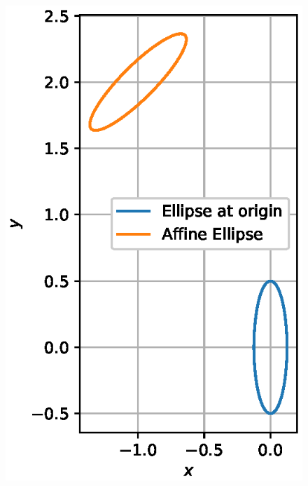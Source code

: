 \begin{enumerate}[label=\arabic*.,ref=\thesubsection.\theenumi]
\begin{figure}[!ht]
\includegraphics[width=\columnwidth]{./conics/figs/ellipse.eps}
\caption{}
\label{fig:ellipse}
\end{figure}

\end{enumerate}

